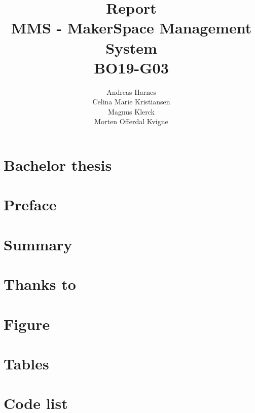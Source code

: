 \documentclass[12pt]{report}
\title {
    Report \\
    MMS - MakerSpace Management System \\
    BO19-G03
}
\author {
    Andreas Harnes \\
    Celina Marie Kristiansen \\
    Magnus Klerck \\
    Morten Offerdal Kvigne
}
\begin{document}
\maketitle

\makepresentationpage

\section{Bachelor thesis}

\section{Preface}

\section{Summary}

\section{Thanks to}

\maketitle

\newpage

\tableofcontents

\newpage

\section{Figure}

\section{Tables}

\section{Code list}















\printbibliography
\end{document}
